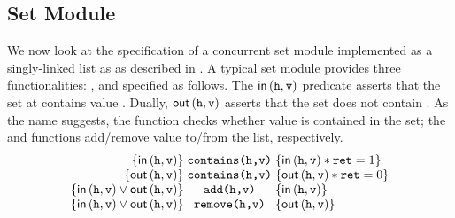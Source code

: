 \subsection{Set Module}
We now look at the specification of a concurrent set module implemented as a singly-linked list as as described in \cite{cap-ecoop10}. A typical set module provides three functionalities: ,  and  specified as follows. The $\textsf{in}\left(\texttt{h}, \texttt{v}\right) $ predicate asserts that the set at  contains value . Dually, $\textsf{out}\left(\texttt{h}, \texttt{v}\right)$ asserts that the set does not contain . As the name suggests, the  function checks whether value  is contained in the set; the  and  functions add/remove value  to/from the list, respectively. 
%
\[
\begin{array}{@{} r @{\hspace*{3pt}} c @{\hspace*{3pt}} l @{}}
	\left\{ \inSet{\var{h}}{\var{v}} \right\} & \command{contains(h,v)} & \left\{ \inSet{\var{h}}{\var{v}} * \var{ret} = 1 \right\} \\
	
	\left\{ \outSet{\var{h}}{\var{v}} \right\} & \command{contains(h,v)} & \left\{ \outSet{\var{h}}{\var{v}} * \var{ret} = 0 \right\} \\
	
	\left\{ \inSet{\var{h}}{\var{v}} \lor \outSet{\var{h}}{\var{v}}  \right\} & \command{add(h,v)} & \left\{ \inSet{\var{h}}{\var{v}} \right\}\\ 
	
	\left\{ \inSet{\var{h}}{\var{v}} \lor \outSet{\var{h}}{\var{v}}  \right\} & \command{remove(h,v)} & \left\{ \outSet{\var{h}}{\var{v}} \right\} 
\end{array}
\]
%
